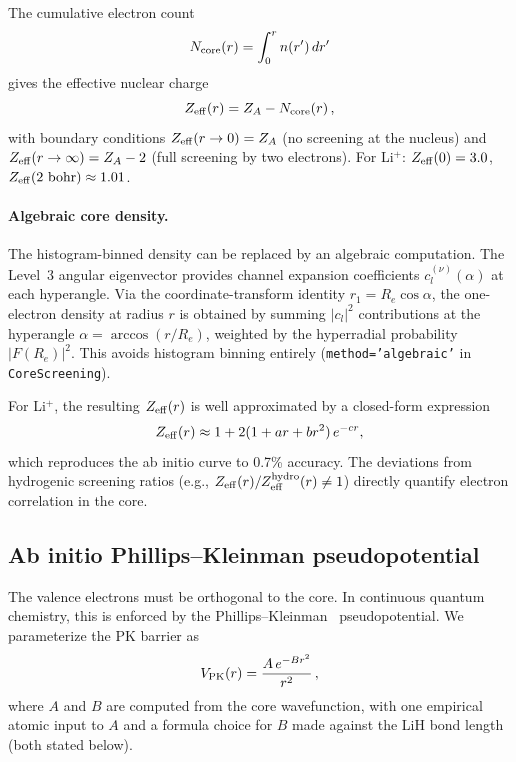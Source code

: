 \documentclass[aps,pra,twocolumn,superscriptaddress,longbibliography,floatfix]{revtex4-2}
\begin{document}
The cumulative electron count
\begin{equation}
  N_{\rm core}(r) = \int_0^r n(r')\,dr'
  \label{eq:Ncore}
\end{equation}
gives the effective nuclear charge
\begin{equation}
  Z_{\rm eff}(r) = Z_A - N_{\rm core}(r)\,,
  \label{eq:Zeff}
\end{equation}
with boundary conditions $Z_{\rm eff}(r\to 0) = Z_A$ (no screening at
the nucleus) and $Z_{\rm eff}(r\to\infty) = Z_A - 2$ (full screening
by two electrons).  For Li$^+$: $Z_{\rm eff}(0) = 3.0$,
$Z_{\rm eff}(2\text{ bohr}) \approx 1.01$.

\paragraph{Algebraic core density.}
The histogram-binned density can be replaced by an algebraic
computation.  The Level~3 angular eigenvector provides channel
expansion coefficients $c_{l}^{(\nu)}(\alpha)$ at each hyperangle.
Via the coordinate-transform identity
$r_1 = R_e \cos\alpha$, the one-electron density at radius $r$
is obtained by summing $|c_l|^2$ contributions at the hyperangle
$\alpha = \arccos(r/R_e)$, weighted by the hyperradial probability
$|F(R_e)|^2$.  This avoids histogram binning entirely
(\texttt{method='algebraic'} in \texttt{CoreScreening}).

For Li$^+$, the resulting $Z_{\rm eff}(r)$ is well approximated
by a closed-form expression
\begin{equation}
  Z_{\rm eff}(r) \approx 1 + 2(1 + ar + br^2)\,e^{-cr},
  \label{eq:zeff_fit}
\end{equation}
which reproduces the ab initio curve to 0.7\% accuracy.
The deviations from hydrogenic screening ratios
(e.g., $Z_{\rm eff}(r)/Z_{\rm eff}^{\rm hydro}(r) \ne 1$)
directly quantify electron correlation in the core.


\subsection{Ab initio Phillips--Kleinman pseudopotential}
\label{sec:pk}

The valence electrons must be orthogonal to the core.  In continuous
quantum chemistry, this is enforced by the
Phillips--Kleinman~\cite{pk1959} pseudopotential.
We parameterize the PK barrier as
\begin{equation}
  V_{\rm PK}(r) = \frac{A\,e^{-Br^2}}{r^2}\,,
  \label{eq:Vpk}
\end{equation}
where $A$ and $B$ are computed from the core wavefunction, with one
empirical atomic input to $A$ and a formula choice for $B$ made against
the LiH bond length (both stated below).
\end{document}
